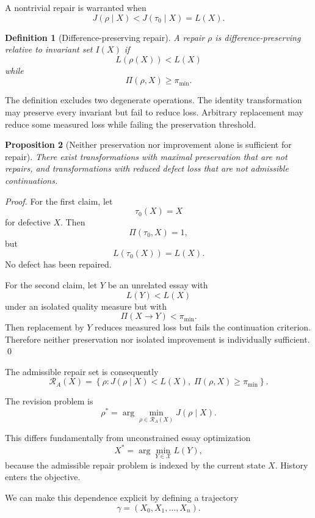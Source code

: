 \documentclass[11pt]{article}
\newtheorem{definition}{Definition}[section]
\newtheorem{proposition}[definition]{Proposition}
\begin{document}
A nontrivial repair is warranted when
\[
    J(\rho\mid X)
    <
    J(\tau_0\mid X)
    =
    L(X).
\]

\begin{definition}[Difference-preserving repair]
A repair \(\rho\) is difference-preserving relative to invariant set \(I(X)\) if
\[
    L(\rho(X))<L(X)
\]
while
\[
    \Pi(\rho,X)\geq\pi_{\min}.
\]
\end{definition}

The definition excludes two degenerate operations. The identity transformation may preserve every invariant but fail to reduce loss. Arbitrary replacement may reduce some measured loss while failing the preservation threshold.

\begin{proposition}[Neither preservation nor improvement alone is sufficient for repair]
There exist transformations with maximal preservation that are not repairs, and transformations with reduced defect loss that are not admissible continuations.
\end{proposition}

\begin{proof}
For the first claim, let
\[
    \tau_0(X)=X
\]
for defective \(X\). Then
\[
    \Pi(\tau_0,X)=1,
\]
but
\[
    L(\tau_0(X))=L(X).
\]
No defect has been repaired.

For the second claim, let \(Y\) be an unrelated essay with
\[
    L(Y)<L(X)
\]
under an isolated quality measure but with
\[
    \Pi(X\rightarrow Y)<\pi_{\min}.
\]
Then replacement by \(Y\) reduces measured loss but fails the continuation criterion. Therefore neither preservation nor isolated improvement is individually sufficient. \qed
\end{proof}

The admissible repair set is consequently
\[
    \mathcal{R}_A(X)
    =
    \left\{
        \rho:
        J(\rho\mid X)<L(X),
        \;
        \Pi(\rho,X)\geq\pi_{\min}
    \right\}.
\]

The revision problem is
\[
    \rho^\ast
    =
    \arg\min_{\rho\in\mathcal{R}_A(X)}
    J(\rho\mid X).
\]

This differs fundamentally from unconstrained essay optimization
\[
    X^\ast
    =
    \arg\min_{Y\in\mathcal{X}}
    L(Y),
\]
because the admissible repair problem is indexed by the current state \(X\). History enters the objective.

We can make this dependence explicit by defining a trajectory
\[
    \gamma
    =
    (X_0,X_1,\ldots,X_n).
\]
\end{document}

